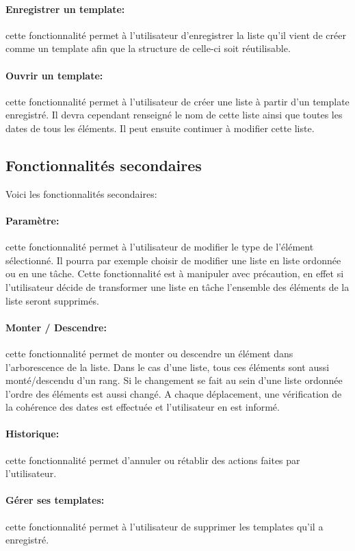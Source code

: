 \documentclass[a4paper,10pt]{article}
\begin{document}
\paragraph{Enregistrer un template:} cette fonctionnalité permet à l'utilisateur d'enregistrer la liste qu'il vient de créer comme un template afin que la structure de celle-ci soit réutilisable.
\paragraph{Ouvrir un template:} cette fonctionnalité permet à l'utilisateur de créer une liste à partir d'un template enregistré. Il devra cependant renseigné le nom de cette liste ainsi que toutes les dates de tous les éléments. Il peut ensuite continuer à modifier cette liste.

\subsection{Fonctionnalités secondaires}
Voici les fonctionnalités secondaires:
\paragraph{Paramètre:} cette fonctionnalité permet à l'utilisateur de modifier le type de l'élément sélectionné. Il pourra par exemple choisir de modifier une liste en liste ordonnée ou en une tâche. Cette fonctionnalité est à manipuler avec précaution, en effet si l'utilisateur décide de transformer une liste en tâche l'ensemble des éléments de la liste seront supprimés.
\paragraph{Monter / Descendre:} cette fonctionnalité permet de monter ou descendre un élément dans l'arborescence de la liste. Dans le cas d'une liste, tous ces éléments sont aussi monté/descendu d'un rang. Si le changement se fait au sein d'une liste ordonnée l'ordre des éléments est aussi changé. A chaque déplacement, une vérification de la cohérence des dates est effectuée et l'utilisateur en est informé.
\paragraph{Historique:} cette fonctionnalité permet d'annuler ou rétablir des actions faites par l'utilisateur.
\paragraph{Gérer ses templates:} cette fonctionnalité permet à l'utilisateur de supprimer les templates qu'il a enregistré.
\end{document}
